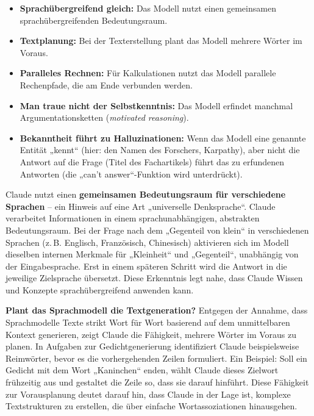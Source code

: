 \documentclass[
  ngerman,
  letterpaper,
  DIV=11]{scrreprt}
\providecommand{\tightlist}{%
  \setlength{\itemsep}{0pt}\setlength{\parskip}{0pt}}
\begin{document}
\begin{itemize}
\tightlist
\item
  \textbf{Sprachübergreifend gleich:} Das Modell nutzt einen gemeinsamen
  sprachübergreifenden Bedeutungsraum.
\item
  \textbf{Textplanung:} Bei der Texterstellung plant das Modell mehrere
  Wörter im Voraus.
\item
  \textbf{Paralleles Rechnen:} Für Kalkulationen nutzt das Modell
  parallele Rechenpfade, die am Ende verbunden werden.
\item
  \textbf{Man traue nicht der Selbstkenntnis:} Das Modell erfindet
  manchmal Argumentationsketten (\emph{motivated reasoning}).
\item
  \textbf{Bekanntheit führt zu Halluzinationen:} Wenn das Modell eine
  genannte Entität „kennt`` (hier: den Namen des Forschers, Karpathy),
  aber nicht die Antwort auf die Frage (Titel des Fachartikels) führt
  das zu erfundenen Antworten (die „can't answer``-Funktion wird
  unterdrückt).
\end{itemize}

Claude nutzt einen \textbf{gemeinsamen Bedeutungsraum für verschiedene
Sprachen} -- ein Hinweis auf eine Art „universelle Denksprache``. Claude
verarbeitet Informationen in einem sprachunabhängigen, abstrakten
Bedeutungsraum. Bei der Frage nach dem „Gegenteil von klein`` in
verschiedenen Sprachen (z.\,B. Englisch, Französisch, Chinesisch)
aktivieren sich im Modell dieselben internen Merkmale für „Kleinheit``
und „Gegenteil``, unabhängig von der Eingabesprache. Erst in einem
späteren Schritt wird die Antwort in die jeweilige Zielsprache
übersetzt. Diese Erkenntnis legt nahe, dass Claude Wissen und Konzepte
sprachübergreifend anwenden kann.

\textbf{Plant das Sprachmodell die Textgeneration?} Entgegen der
Annahme, dass Sprachmodelle Texte strikt Wort für Wort basierend auf dem
unmittelbaren Kontext generieren, zeigt Claude die Fähigkeit, mehrere
Wörter im Voraus zu planen. In Aufgaben zur Gedichtgenerierung
identifiziert Claude beispielsweise Reimwörter, bevor es die
vorhergehenden Zeilen formuliert. Ein Beispiel: Soll ein Gedicht mit dem
Wort „Kaninchen`` enden, wählt Claude dieses Zielwort frühzeitig aus und
gestaltet die Zeile so, dass sie darauf hinführt. \hspace{0pt}Diese
Fähigkeit zur Vorausplanung deutet darauf hin, dass Claude in der Lage
ist, komplexe Textstrukturen zu erstellen, die über einfache
Wortassoziationen hinausgehen.
\end{document}
